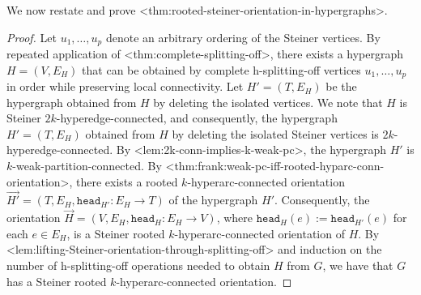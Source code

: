 \documentclass{article}
\def\Cref#1{<#1>}%
\newcommand{\head}{\ensuremath{\texttt{head}}\xspace}
\begin{document}
We now restate and prove \Cref{thm:rooted-steiner-orientation-in-hypergraphs}.

\thmRootedSteinerArcConnectedOrientationsHypergraphs*
\begin{proof}
    Let $u_1, \ldots, u_p$ denote an arbitrary ordering of the Steiner vertices. By repeated application of \Cref{thm:complete-splitting-off}, there exists a hypergraph $H = (V, E_H)$ that can be obtained by complete h-splitting-off vertices $u_1, \ldots, u_p$ in order while preserving local connectivity. Let $H' = (T, E_H)$ be the hypergraph obtained from $H$ by deleting the isolated vertices. We note that $H$ is Steiner $2k$-hyperedge-connected, and consequently, the hypergraph $H' = (T, E_H)$ obtained from $H$ by deleting the isolated Steiner vertices is $2k$-hyperedge-connected. By \Cref{lem:2k-conn-implies-k-weak-pc}, the hypergraph $H'$ is $k$-weak-partition-connected. By \Cref{thm:frank:weak-pc-iff-rooted-hyparc-conn-orientation}, there exists a rooted $k$-hyperarc-connected orientation $\overrightarrow{H'} = (T, E_{H}, \head_{H'}:E_H \rightarrow T)$ of the hypergraph $H'$. Consequently, the orientation $\overrightarrow{H} = (V, E_H, \head_H:E_H \rightarrow V)$, where $\head_H(e) := \head_{H'}(e)$ for each $e \in E_H$, is a Steiner rooted $k$-hyperarc-connected orientation of $H$. By \Cref{lem:lifting-Steiner-orientation-through-splitting-off} and induction on the number of h-splitting-off operations needed to obtain $H$ from $G$, we have that $G$ has a Steiner rooted $k$-hyperarc-connected orientation.
\end{proof}
\end{document}
